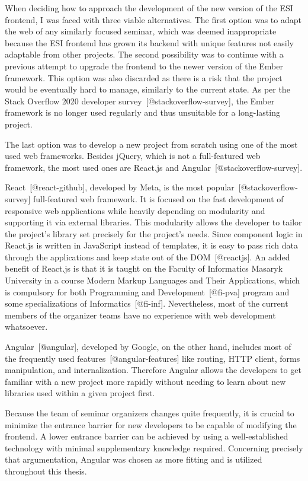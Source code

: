 \documentclass[
  digital, %
  oneside, %
  lof,     %
  lot,     %
]{fithesis4}
\begin{document}
When deciding how to approach the development of the new version of the ESI frontend, I was faced with three viable alternatives. The first option was to adapt the web of any similarly focused seminar, which was deemed inappropriate because the ESI frontend has grown its backend with unique features not easily adaptable from other projects. The second possibility was to continue with a previous attempt to upgrade the frontend to the newer version of the Ember framework. This option was also discarded as there is a risk that the project would be eventually hard to manage, similarly to the current state. As per the Stack Overflow 2020 developer survey~[@stackoverflow-survey], the Ember framework is no longer used regularly and thus unsuitable for a long-lasting project.

The last option was to develop a new project from scratch using one of the most used web frameworks. Besides jQuery, which is not a full-featured web framework, the most used ones are React.js and Angular~[@stackoverflow-survey].

React~[@react-github], developed by Meta, is the most popular~[@stackoverflow-survey] full-featured web framework. It is focused on the fast development of responsive web applications while heavily depending on modularity and supporting it via external libraries. This modularity allows the developer to tailor the project's library set precisely for the project's needs. Since component logic in React.js is written in JavaScript instead of templates, it is easy to pass rich data through the applications and keep state out of the DOM~[@reactjs]. An added benefit of React.js is that it is taught on the Faculty of Informatics Masaryk University in a course Modern Markup Languages and Their Applications, which is compulsory for both
Programming and Development~[@fi-pva] program and some specializations of Informatics~[@fi-inf]. Nevertheless, most of the current members of the organizer teams have no experience with web development whatsoever.

Angular~[@angular], developed by Google, on the other hand, includes most of the frequently used features~[@angular-features] like routing, HTTP client, forms manipulation, and internalization. Therefore Angular allows the developers to get familiar with a new project more rapidly without needing to learn about new libraries used within a given project first.

Because the team of seminar organizers changes quite frequently, it is crucial to minimize the entrance barrier for new developers to be capable of modifying the frontend. A lower entrance barrier can be achieved by using a well-established technology with minimal supplementary knowledge required. Concerning precisely that argumentation, Angular was chosen as more fitting and is utilized throughout this thesis.
\end{document}
